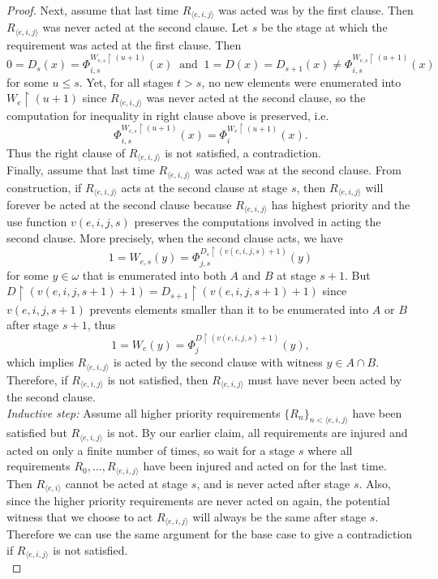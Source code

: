 \documentclass{article}
\begin{document}
\begin{proof}
    Next, assume that last time $R_{\langle e,i,j\rangle}$ was acted was
    by the first clause. Then $R_{\langle e,i,j\rangle}$ was never acted
    at the second clause. Let $s$ be the stage at which the requirement was
    acted at the first clause. Then
    \[0=D_s(x) =\Phi_{i,s}^{W_{e,s}\restriction (u+1)} (x)\;\;
    \text{and}\;\; 1=D(x)=D_{s+1}(x) \neq\Phi_{i,s}^{W_{e,s}\restriction
    (u+1)} (x)\]
    for some $u\leq s$. Yet, for all stages $t>s$, no new elements were
    enumerated into $W_e\restriction (u+1)$ since $R_{\langle
    e,i,j\rangle}$ was never acted at the second clause,
    so the computation for inequality in right clause above is preserved,
    i.e.
    \[\Phi_{i,s}^{W_{e,s}\restriction (u+1)} (x)
    =\Phi_{i}^{W_{e}\restriction (u+1)} (x).\]
    Thus the right clause of $R_{\langle e,i,j\rangle}$ is not satisfied, a
    contradiction. \\

    Finally, assume that last time $R_{\langle e,i,j\rangle}$ was acted
    was at the second clause. From construction, if $R_{\langle
    e,i,j\rangle}$ acts at the second clause at stage $s$, then $R_{\langle
    e,i,j\rangle}$ will forever be acted at the second clause because
    $R_{\langle e,i,j\rangle}$ has highest priority and the use function
    $v(e,i,j,s)$ preserves the computations involved in acting the
    second clause. More precisely, when the second clause acts, we
    have
    \[1=W_{e,s}(y) =\Phi_{j,s}^{D_s\restriction (v(e,i,j,s)+1)}(y)\]
    for some $y\in\omega$ that is enumerated into both $A$ and $B$ at stage
    $s+1$. But $D\restriction (v(e,i,j,s+1)+1) =D_{s+1}\restriction
    (v(e,i,j,s+1)+1)$ since $v(e,i,j,s+1)$ prevents elements smaller than
    it to be enumerated into $A$ or $B$ after stage $s+1$, thus
    \[1=W_{e}(y) =\Phi_{j}^{D\restriction (v(e,i,j,s)+1)}(y),\] which
    implies $R_{\langle e,i,j\rangle}$ is acted by the second clause
    with witness $y\in A\cap B$. Therefore, if $R_{\langle e,i,j\rangle}$
    is not satisfied, then $R_{\langle e,i,j\rangle}$ must have never
    been acted by the second clause. \\

    \textit{Inductive step:} Assume all higher priority requirements
    $\{R_n\}_{n <\langle e,i,j\rangle}$ have been satisfied but $R_{\langle
    e,i,j\rangle}$ is not. By our earlier claim, all requirements are
    injured and acted on only a finite number of times, so wait for a
    stage $s$ where all requirements $R_0,\ldots,R_{\langle e,i,j\rangle}$
    have been injured and acted on for the last time. Then $R_{\langle
    e,i\rangle}$ cannot be acted at stage $s$, and is never acted
    after stage $s$. Also, since the higher priority requirements are never
    acted on again, the potential witness that we choose to act
    $R_{\langle e,i,j\rangle}$ will always be the same after stage $s$.
    Therefore we can use the same argument for the base case to give a
    contradiction if $R_{\langle e,i,j\rangle}$ is not satisfied. \\
  \end{proof}
\end{document}
